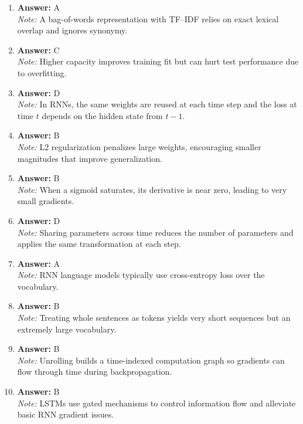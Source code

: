 \documentclass[12pt]{article}
\begin{document}
\begin{enumerate}[label=Q\arabic*.]
 \item \textbf{Answer:} A \\
 \textit{Note:} A bag-of-words representation with TF--IDF relies on exact lexical overlap and ignores synonymy.
 
 \item \textbf{Answer:} C \\
 \textit{Note:} Higher capacity improves training fit but can hurt test performance due to overfitting.
 
 \item \textbf{Answer:} D \\
 \textit{Note:} In RNNs, the same weights are reused at each time step and the loss at time $t$ depends on the hidden state from $t-1$.
 
 \item \textbf{Answer:} B \\
 \textit{Note:} L2 regularization penalizes large weights, encouraging smaller magnitudes that improve generalization.
 
 \item \textbf{Answer:} B \\
 \textit{Note:} When a sigmoid saturates, its derivative is near zero, leading to very small gradients.
 
 \item \textbf{Answer:} D \\
 \textit{Note:} Sharing parameters across time reduces the number of parameters and applies the same transformation at each step.
 
 \item \textbf{Answer:} A \\
 \textit{Note:} RNN language models typically use cross-entropy loss over the vocabulary.
 
 \item \textbf{Answer:} B \\
 \textit{Note:} Treating whole sentences as tokens yields very short sequences but an extremely large vocabulary.
 
 \item \textbf{Answer:} B \\
 \textit{Note:} Unrolling builds a time-indexed computation graph so gradients can flow through time during backpropagation.
 
 \item \textbf{Answer:} B \\
 \textit{Note:} LSTMs use gated mechanisms to control information flow and alleviate basic RNN gradient issues.
 

\end{enumerate}
\end{document}
